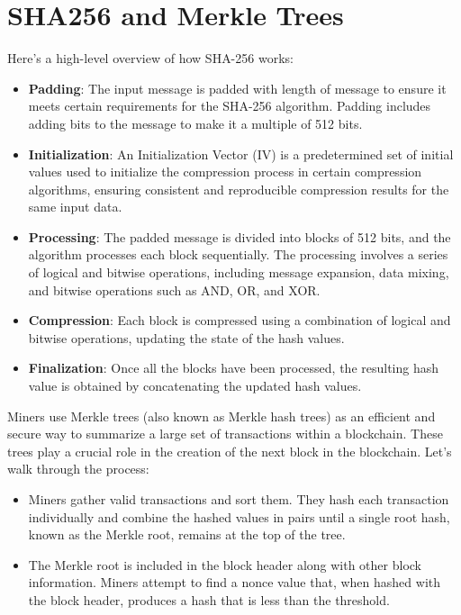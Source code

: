 \documentclass{report}
\begin{document}
\section{SHA256 and Merkle Trees}
Here's a high-level overview of how SHA-256 works:
\begin{itemize}
\item \textbf{Padding}: The input message is padded with length of message to ensure it meets certain requirements for the SHA-256 algorithm. Padding includes adding bits to the message to make it a multiple of 512 bits.
\item \textbf{Initialization}: An Initialization Vector (IV) is a predetermined set of initial values used to initialize the compression process in certain compression algorithms, ensuring consistent and reproducible compression results for the same input data.
\item \textbf{Processing}: The padded message is divided into blocks of 512 bits, and the algorithm processes each block sequentially. The processing involves a series of logical and bitwise operations, including message expansion, data mixing, and bitwise operations such as AND, OR, and XOR.
\item \textbf{Compression}: Each block is compressed using a combination of logical and bitwise operations, updating the state of the hash values.
\item \textbf{Finalization}: Once all the blocks have been processed, the resulting hash value is obtained by concatenating the updated hash values.
\end{itemize}
Miners use Merkle trees (also known as Merkle hash trees) as an efficient and secure way to summarize a large set of transactions within a blockchain. These trees play a crucial role in the creation of the next block in the blockchain. Let's walk through the process:
\begin{itemize}
    \item Miners gather valid transactions and sort them. They hash each transaction individually and combine the hashed values in pairs until a single root hash, known as the Merkle root, remains at the top of the tree.
    \item The Merkle root is included in the block header along with other block information. Miners attempt to find a nonce value that, when hashed with the block header, produces a hash that is less than the threshold.
\end{itemize}
\end{document}
